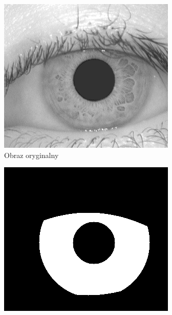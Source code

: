 \begin{figure}[ht]
  \centering
  \begin{subfigure}[b]{0.35\textwidth}
    \includegraphics[width=\textwidth]{images/normalization/original.png}
    \caption{Obraz oryginalny}
  \end{subfigure}
  \begin{subfigure}[b]{0.35\textwidth}
    \includegraphics[width=\textwidth]{images/normalization/mask.png}

\end{subfigure}
\end{figure}
